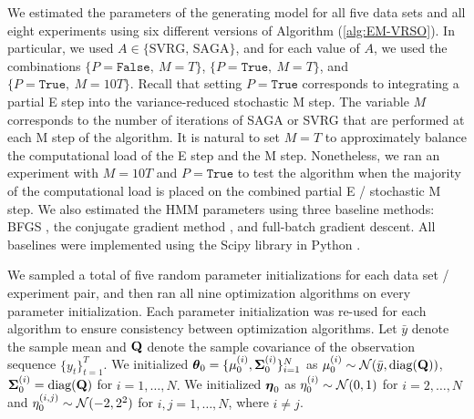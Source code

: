 We estimated the parameters of the generating model for all five data sets and all eight experiments using six different versions of Algorithm (\ref{alg:EM-VRSO}). In particular, we used $A \in \{\text{SVRG, SAGA}\}$, and for each value of $A$, we used the combinations $\{P = \texttt{False}, ~ M = T\}$, $\{P = \texttt{True}, ~ M = T\}$, and $\{P = \texttt{True}, ~ M = 10T\}$. Recall that setting $P = \texttt{True}$ corresponds to integrating a partial E step into the variance-reduced stochastic M step. The variable $M$ corresponds to the number of iterations of SAGA or SVRG that are performed at each M step of the algorithm. It is natural to set $M=T$ to approximately balance the computational load of the E step and the M step. Nonetheless, we ran an experiment with $M=10T$ and $P = \texttt{True}$ to test the algorithm when the majority of the computational load is placed on the combined partial E / stochastic M step. We also estimated the HMM parameters using three baseline methods: BFGS \citep{Fletcher:2000}, the conjugate gradient method \citep{Fletcher:1964}, and full-batch gradient descent. All baselines were implemented using the Scipy library in Python \citep{Virtanen:2019}.

We sampled a total of five random parameter initializations for each data set / experiment pair, and then ran all nine optimization algorithms on every parameter initialization. Each parameter initialization was re-used for each algorithm to ensure consistency between optimization algorithms. Let $\bar y$ denote the sample mean and $\mathbf{Q}$ denote the sample covariance of the observation sequence $\{y_t\}_{t=1}^T$. We initialized $\boldsymbol{\theta}_0 = \{\mu^{(i)}_0,\boldsymbol{\Sigma}^{(i)}_0\}_{i=1}^N$ as
%
    $\mu^{(i)}_0 \sim \mathcal{N}(\bar y, \text{diag}(\mathbf{Q}))$, $\boldsymbol{\Sigma}^{(i)}_0 = \text{diag}(\mathbf{Q})$ for $i = 1,\ldots,N.$ We initialized $\boldsymbol{\eta}_0$ as
    $\eta^{(i)}_0 \sim \mathcal{N}(0,1)$ for $i = 2,\ldots,N$ and
    $\eta^{(i,j)}_0 \sim \mathcal{N}(-2,2^2)$ for $i,j = 1,\ldots,N$, where $i \neq j$.
%

